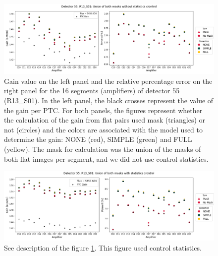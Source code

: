 \begin{figure}[!htb]
    \centering
    \includegraphics[width=\textwidth]{Figures/GainFlats_NOstats_det55.png}
    \caption{Gain value on the left panel and the relative percentage error on the right panel for the 16 segments (amplifiers) of detector 55 (R13\_S01). In the left panel, the black crosses represent the value of the gain per PTC. For both panels, the figures represent whether the calculation of the gain from flat pairs used mask (triangles) or not (circles) and the colors are associated with the model used to determine the gain: NONE (red), SIMPLE (green) and FULL (yellow). The mask for calculation was the union of the masks of both flat images per segment, and we did not use control statistics.}
    \label{fig:GainFlats_NOstats}
\end{figure}

\begin{figure}[H]
    \centering
    \includegraphics[width=\textwidth]{Figures/GainFlats_stats_det55.png}
    \caption{See description of the figure \ref{fig:GainFlats_NOstats}. This figure used control statistics.}
    \label{fig:GainFlats_stats}
\end{figure}
 
